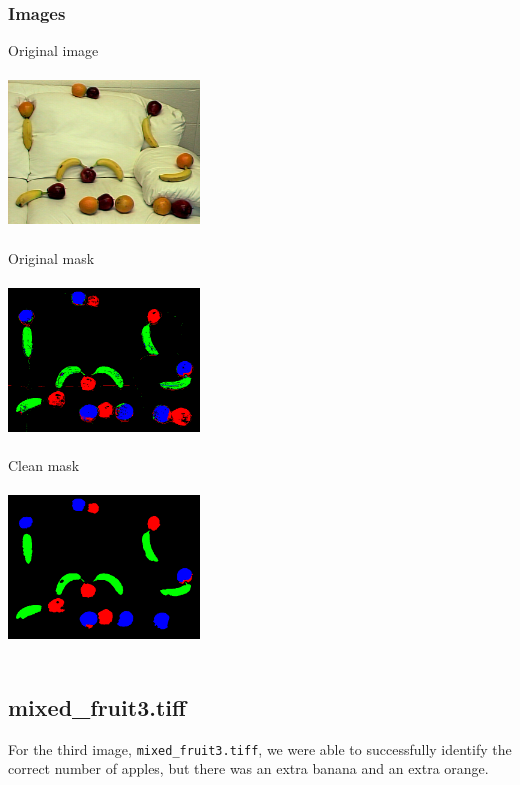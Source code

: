 \documentclass{article}
\begin{document}
\subsubsection{Images}
Original image\\~\\
\includegraphics[width=2in]{mixed_fruit2.png}\\~\\
Original mask\\~\\
\includegraphics[width=2in]{mixed_fruit2_step1.png}\\~\\
Clean mask\\~\\
\includegraphics[width=2in]{mixed_fruit2_step2.png}\\~\\

\subsection{mixed\_fruit3.tiff}
For the third image, \texttt{mixed\_fruit3.tiff}, we were able to successfully identify the correct number of apples, but there was an extra banana and an extra orange.
\end{document}
